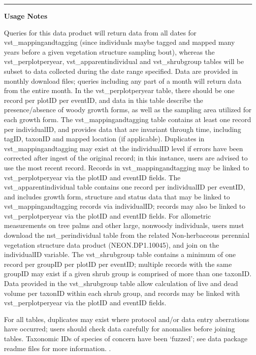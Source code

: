 \documentclass[]{article}
\begin{document}
\begin{center}\rule{0.5\linewidth}{\linethickness}\end{center}

\textbf{Usage Notes}

Queries for this data product will return data from all dates for
vst\_mappingandtagging (since individuals maybe tagged and mapped many
years before a given vegetation structure sampling bout), whereas the
vst\_perplotperyear, vst\_apparentindividual and vst\_shrubgroup tables
will be subset to data collected during the date range specified. Data
are provided in monthly download files; queries including any part of a
month will return data from the entire month. In the vst\_perplotperyear
table, there should be one record per plotID per eventID, and data in
this table describe the presence/absence of woody growth forms, as well
as the sampling area utilized for each growth form. The
vst\_mappingandtagging table contains at least one record per
individualID, and provides data that are invariant through time,
including tagID, taxonID and mapped location (if applicable). Duplicates
in vst\_mappingandtagging may exist at the individualID level if errors
have been corrected after ingest of the original record; in this
instance, users are advised to use the most recent record. Records in
vst\_mappingandtagging may be linked to vst\_perplotperyear via the
plotID and eventID fields. The vst\_apparentindividual table contains
one record per individualID per eventID, and includes growth form,
structure and status data that may be linked to vst\_mappingandtagging
records via individualID; records may also be linked to
vst\_perplotperyear via the plotID and eventID fields. For allometric
measurements on tree palms and other large, nonwoody individuals, users
must download the nst\_perindividual table from the related
Non-herbaceous perennial vegetation structure data product
(NEON.DP1.10045), and join on the individualID variable. The
vst\_shrubgroup table contains a minimum of one record per groupID per
plotID per eventID; multiple records with the same groupID may exist if
a given shrub group is comprised of more than one taxonID. Data provided
in the vst\_shrubgroup table allow calculation of live and dead volume
per taxonID within each shrub group, and records may be linked with
vst\_perplotperyear via the plotID and eventID fields.

For all tables, duplicates may exist where protocol and/or data entry
aberrations have occurred; users should check data carefully for
anomalies before joining tables. Taxonomic IDs of species of concern
have been `fuzzed'; see data package readme files for more information.
\newpage
.
\end{document}
